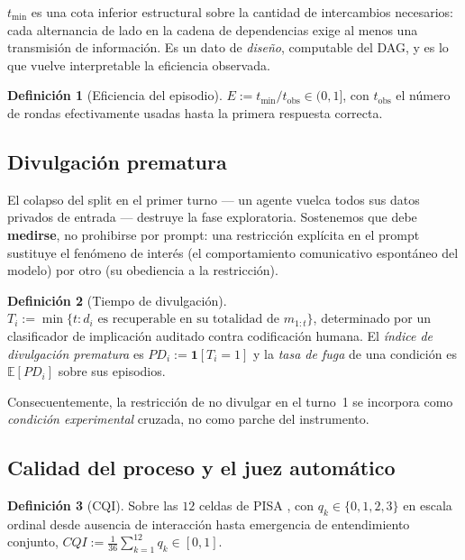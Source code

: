 \documentclass[11pt,a4paper]{article}
\theoremstyle{definition}
\newtheorem{definicion}{Definición}[section]
\theoremstyle{plain}
\theoremstyle{remark}
\newcommand{\ind}[1]{\mathbf{1}\!\left[#1\right]}
\begin{document}
$t_{\min}$ es una cota inferior estructural sobre la cantidad de intercambios
necesarios: cada alternancia de lado en la cadena de dependencias exige al menos
una transmisión de información. Es un dato de \emph{diseño}, computable del DAG,
y es lo que vuelve interpretable la eficiencia observada.

\begin{definicion}[Eficiencia del episodio]
$E := t_{\min}/t_{\mathrm{obs}} \in(0,1]$, con $t_{\mathrm{obs}}$ el número de
rondas efectivamente usadas hasta la primera respuesta correcta.
\end{definicion}

\subsection{Divulgación prematura}

El colapso del split en el primer turno --- un agente vuelca todos sus datos
privados de entrada --- destruye la fase exploratoria. Sostenemos que debe
\textbf{medirse}, no prohibirse por prompt: una restricción explícita en el prompt
sustituye el fenómeno de interés (el comportamiento comunicativo espontáneo del
modelo) por otro (su obediencia a la restricción).

\begin{definicion}[Tiempo de divulgación]
$T_i := \min\{t : d_i \text{ es recuperable en su totalidad de } m_{1:t}\}$,
determinado por un clasificador de implicación auditado contra codificación
humana. El \emph{índice de divulgación prematura} es $PD_i := \ind{T_i=1}$ y la
\emph{tasa de fuga} de una condición es $\mathbb{E}[PD_i]$ sobre sus episodios.
\end{definicion}

Consecuentemente, la restricción de no divulgar en el turno~1 se incorpora como
\emph{condición experimental} cruzada, no como parche del instrumento.

\subsection{Calidad del proceso y el juez automático}

\begin{definicion}[CQI]
Sobre las $12$ celdas de PISA \citep{oecd2017cps}, con
$q_k\in\{0,1,2,3\}$ en escala ordinal desde ausencia de interacción hasta
emergencia de entendimiento conjunto,
$CQI := \tfrac{1}{36}\sum_{k=1}^{12} q_k \in[0,1]$.
\end{definicion}
\end{document}
